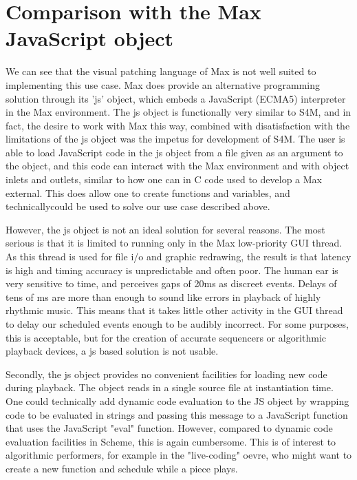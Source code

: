 \documentclass[acmsmall]{acmart}
\begin{document}

\section{Comparison with the Max JavaScript object}
We can see that the visual patching language of Max is not well suited to implementing
this use case. Max does provide an alternative programming solution through its
'js' object, which embeds a JavaScript (ECMA5) interpreter in the Max environment.
The js object is functionally very similar to S4M, and in fact, the desire to 
work with Max this way, combined with disatisfaction with the limitations of the js
object was the impetus for development of S4M. The user is able to load JavaScript
code in the js object from a file given as an argument to the object,
and this code can interact with the Max environment and with object inlets and outlets,
similar to how one can in C code used to develop a Max external.
This does allow one to create functions and variables, and technicallycould be used to solve
our use case described above.

However, the js object is not an ideal solution for several reasons. The most serious
is that it is limited to running only in the Max low-priority GUI thread. As this
thread is used for file i/o and graphic redrawing, the result is that latency
is high and timing accuracy is unpredictable and often poor.
The human ear is very sensitive to time, and perceives gaps of 20ms as discreet
events. Delays of tens of ms are more than enough to sound like errors in playback
of highly rhythmic music. This means that it takes little other activity in the
GUI thread to delay our scheduled events enough to be audibly incorrect. 
For some purposes, this is acceptable, but for the creation of accurate 
sequencers or algorithmic playback devices, a js based solution is not usable.

Secondly, the js object provides no convenient facilities for loading new code
during playback. The object reads in a single source file at instantiation time.
One could technically add dynamic code evaluation to the JS object by wrapping
code to be evaluated in strings and passing this message to a JavaScript function
that uses the JavaScript "eval" function. However, compared to dynamic code
evaluation facilities in Scheme, this is again cumbersome. This is of interest
to algorithmic performers, for example in the "live-coding" oevre, who might
want to create a new function and schedule while a piece plays.
\end{document}
